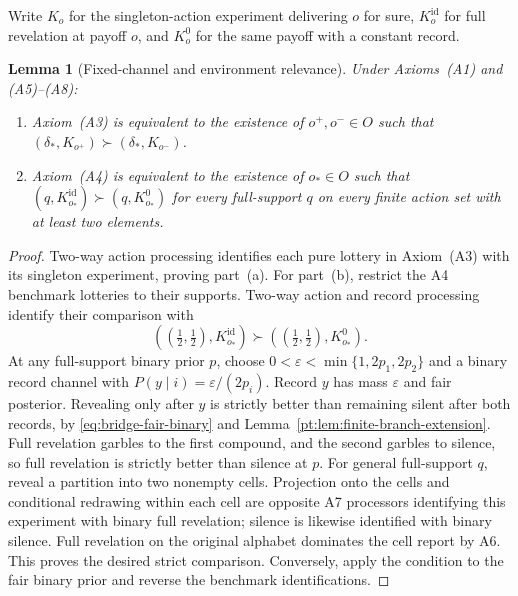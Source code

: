 \documentclass[11pt,a4paper]{article}
\newtheorem{lemma}[theorem]{Lemma}
\theoremstyle{definition}
\newcommand{\1}{\mathbf 1}
\begin{document}
Write $K_o$ for the singleton-action experiment delivering $o$ for sure,
$K_o^{\mathrm{id}}$ for full revelation at payoff $o$, and $K_o^0$ for
the same payoff with a constant record.

\begin{lemma}[Fixed-channel and environment relevance]\label{lem:relevance-bridge}
Under Axioms~\textup{(A1)} and \textup{(A5)--(A8)}:
\begin{enumerate}[label=\textup{(\alph*)},leftmargin=*]
\item Axiom~\textup{(A3)} is equivalent to the existence of $o^+,o^-\in O$
such that $(\delta_*,K_{o^+})\succ(\delta_*,K_{o^-})$.
\item Axiom~\textup{(A4)} is equivalent to the existence of $o_*\in O$
such that $(q,K_{o_*}^{\mathrm{id}})\succ(q,K_{o_*}^0)$ for every
full-support $q$ on every finite action set with at least two elements.
\end{enumerate}
\end{lemma}

\begin{proof}
Two-way action processing identifies each pure lottery in Axiom~\textup{(A3)}
with its singleton experiment, proving part~\textup{(a)}.  For
part~\textup{(b)}, restrict the A4 benchmark lotteries to their supports.
Two-way action and record processing identify their comparison with
\begin{equation}
((\tfrac12,\tfrac12),K_{o_*}^{\mathrm{id}})
\succ((\tfrac12,\tfrac12),K_{o_*}^0).
\label{eq:bridge-fair-binary}
\end{equation}
At any full-support binary prior $p$, choose
$0<\varepsilon<\min\{1,2p_1,2p_2\}$ and a binary record channel with
$P(y\mid i)=\varepsilon/(2p_i)$.  Record $y$ has mass $\varepsilon$ and
fair posterior.  Revealing only after $y$ is strictly better than remaining
silent after both records, by \eqref{eq:bridge-fair-binary} and
Lemma~\ref{pt:lem:finite-branch-extension}.  Full revelation garbles to the
first compound, and the second garbles to silence, so full revelation is
strictly better than silence at $p$.
For general full-support $q$, reveal a partition into two nonempty cells.
Projection onto the cells and conditional redrawing within each cell are
opposite A7 processors identifying this experiment with binary full
revelation; silence is likewise identified with binary silence.  Full
revelation on the original alphabet dominates the cell report by A6.
This proves the desired strict comparison.  Conversely, apply the condition
to the fair binary prior and reverse the benchmark identifications.
\end{proof}
\end{document}
